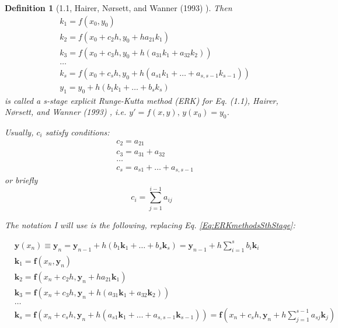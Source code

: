 \documentclass[10pt]{amsart}
\newtheorem{definition}{Definition}
\begin{document}
\begin{multicols*}{2}
\begin{definition}[1.1, Hairer, N\o rsett, and Wanner (1993) \cite{HNW1993}]
Then
\begin{equation}\label{Eq:ERKmethodsSthStage}
	\begin{aligned}
		& k_1 = f(x_0, y_0) \\
		& k_2 = f(x_0 + c_2h, y_0 + ha_{21} k_1) \\
		& k_3 = f(x_0 + c_3h, y_0 + h(a_{31} k_1 + a_{32}k_2)) \\
		& \dots \\
		& k_s = f(x_0 + c_s h, y_0 + h(a_{s1} k_1+ \dots + a_{s, s-1} k_{s-1})) \\
		& y_1 = y_0 + h(b_1k_1 + \dots + b_s k_s)
	\end{aligned}
\end{equation}
is called a s-stage explicit Runge-Kutta method (ERK) for Eq. (1.1), Hairer, N\o rsett, and Wanner (1993) \cite{HNW1993}, i.e. $y' = f(x, y), \, y(x_0) = y_0$.

Usually, $c_i $ satisfy conditions:
\[
\begin{aligned}
	& c_2 = a_{21} \\
	& c_3 = a_{31} + a_{32} \\
	& \dots \\
	& c_s = a_{s1} + \dots + a_{s,s-1}
\end{aligned}
\]
or briefly
\[
c_i = \sum_{j=1}^{i-1} a_{ij}
\]

The notation I will use is the following, replacing Eq. \ref{Eq:ERKmethodsSthStage}:

\begin{equation}\label{Eq:ERKmethodsSthStageMyNotation}
	\begin{aligned}
		& \mathbf{y}(x_n) \equiv \mathbf{y}_n = \mathbf{y}_{n-1} + h(b_1\mathbf{k}_1 + \dots + b_s \mathbf{k}_s) = \mathbf{y}_{n-1} + h \sum_{i=1}^s b_i \mathbf{k}_i \\
		& \mathbf{k}_1 = \mathbf{f}(x_n, \mathbf{y}_n) \\
		& \mathbf{k}_2 = \mathbf{f}(x_n + c_2h, \mathbf{y}_n + ha_{21} \mathbf{k}_1) \\
		& \mathbf{k}_3 = \mathbf{f}(x_n + c_3h, \mathbf{y}_n + h(a_{31} \mathbf{k}_1 + a_{32}\mathbf{k}_2)) \\
		& \dots \\
		& \mathbf{k}_s = \mathbf{f}(x_n + c_s h, \mathbf{y}_n + h(a_{s1} \mathbf{k}_1+ \dots + a_{s, s-1} \mathbf{k}_{s-1})) = \mathbf{f}(x_n + c_s h, \mathbf{y}_n + h \sum_{j=1}^{s-1} a_{sj} \mathbf{k}_j)
	\end{aligned}
\end{equation}


\end{definition}
\end{multicols*}
\end{document}
